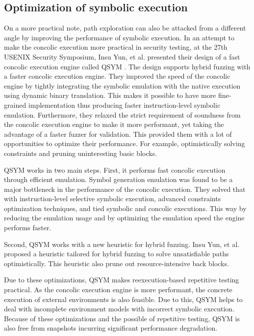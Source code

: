 \documentclass[ runningheads,
               a4paper]{llncs}
\begin{document}


\subsection{Optimization of symbolic execution}
On a more practical note, path exploration can also be attacked from a different angle by improving the performance of symbolic execution. In an attempt to make the concolic execution more practical in security testing, at the 27th USENIX Security Symposium, Insu Yun, et al. presented their design of a fast concolic execution engine called QSYM \cite{yun2018qsym}. The design supports hybrid fuzzing with a faster concolic execution engine. They improved the speed of the concolic engine by tightly integrating the symbolic emulation with the native execution using dynamic binary translation. This makes it possible to have more fine-grained implementation thus producing faster instruction-level symbolic emulation. Furthermore, they relaxed the strict requirement of soundness from the concolic execution engine to make it more performant, yet taking the advantage of a faster fuzzer for validation. This provided them with a lot of opportunities to optimize their performance. For example, optimistically solving constraints and pruning uninteresting basic blocks.


QSYM \cite{yun2018qsym} works in two main steps. First, it performs fast concolic execution through efficient emulation. Symbol generation emulation was found to be a major bottleneck in the performance of the concolic execution. They solved that with instruction-level selective symbolic execution, advanced constraints optimization techniques, and tied symbolic and concolic executions. This way by reducing the emulation usage and by optimizing the emulation speed the engine performs faster.


Second, QSYM \cite{yun2018qsym} works with a new heuristic for hybrid fuzzing. Insu Yun, et al. proposed a heuristic tailored for hybrid fuzzing to solve unsatisfiable paths optimistically. This heuristic also prune out resource-intensive back blocks.


Due to these optimizations, QSYM makes reexecution-based repetitive testing practical. As the concolic execution engine is more performant, the concrete execution of external environments is also feasible. Due to this, QSYM helps to deal with incomplete environment models with incorrect symbolic execution. Because of these optimizations and the possible of repetitive testing, QSYM is also free from snapshots incurring significant performance degradation.
\end{document}

